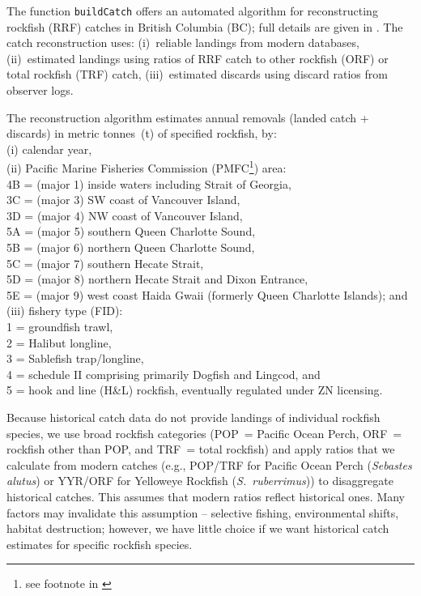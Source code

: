 \documentclass[letterpaper,12pt,fleqn]{article}
\def\tab{\hspace{0.5 in}}
\newcommand{\code}[1]{\small\texttt{#1}\normalsize}
\begin{document}
\tab The function \code{buildCatch} offers an automated algorithm for reconstructing rockfish (RRF) catches in British Columbia (BC); full details are given in \citet{Haigh-Yamanaka:2011}. The catch reconstruction uses: 
(i)~reliable landings from modern databases, 
(ii)~estimated landings using ratios of RRF catch to other rockfish (ORF) or total rockfish (TRF) catch, 
(iii)~estimated discards using discard ratios from observer logs.

\tab The reconstruction algorithm estimates annual removals (landed catch + discards) in metric tonnes~(t) of specified rockfish, by:\\
(i) calendar year,\\
(ii) Pacific Marine Fisheries Commission (PMFC\footnote{see footnote in \citet{Forrester:1969}}) area:\\
\tab 4B = (major 1) inside waters including Strait of Georgia,\\
\tab 3C = (major 3) SW coast of Vancouver Island,\\
\tab 3D = (major 4) NW coast of Vancouver Island,\\
\tab 5A = (major 5) southern Queen Charlotte Sound,\\
\tab 5B = (major 6) northern Queen Charlotte Sound,\\
\tab 5C = (major 7) southern Hecate Strait,\\
\tab 5D = (major 8) northern Hecate Strait and Dixon Entrance,\\
\tab 5E = (major 9) west coast Haida Gwaii (formerly Queen Charlotte Islands); and\\
(iii) fishery type (FID):\\
\tab 1 = groundfish trawl,\\
\tab 2 = Halibut longline,\\
\tab 3 = Sablefish trap/longline,\\
\tab 4 = schedule II comprising primarily Dogfish and Lingcod, and\\
\tab 5 = hook and line (H\&L) rockfish, eventually regulated under ZN licensing.

\tab Because historical catch data do not provide landings of individual rockfish species, we use broad rockfish categories (POP~= Pacific Ocean Perch, ORF~= rockfish other than POP, and TRF~= total rockfish) and apply ratios that we calculate from modern catches (e.g., POP/TRF for Pacific Ocean Perch (\emph{Sebastes alutus}) or YYR/ORF for Yelloweye Rockfish (\emph{S.~ruberrimus})) to disaggregate historical catches. This assumes that modern ratios reflect historical ones. Many factors may invalidate this assumption -- selective fishing, environmental shifts, habitat destruction; however, we have little choice if we want historical catch estimates for specific rockfish species.
\end{document}
